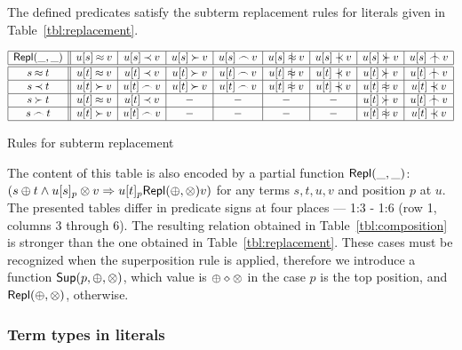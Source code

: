 \begin{lemma} \label{le:replacement-in-atoms}
The defined predicates satisfy the subterm replacement rules for literals
given in Table~\ref {tbl:replacement}.
\begin{table}[hbt]
\[\begin{array}{|c||c|c|c|c|c|c|c|c|}
\hline
 \Repl\_\_   & u[s]\Eq v   & u[s]\Incl v & u[s]\Cont v & u[s]\Int v & u[s]\notEq v & u[s]\notIncl v & u[s]\notCont v & u[s]\notInt v\\
\hline
\hline
s\Eq t   & u[t]\Eq v   & u[t]\Incl v & u[t]\Cont v & u[t]\Int v & u[t]\notEq v & u[t]\notIncl v & u[t]\notCont v & u[t]\notInt v\\
\hline
s\Incl t & u[t]\Cont v & u[t]\Int v  & u[t]\Cont v & u[t]\Int v & u[t]\notEq v & u[t]\notIncl v & u[t]\notEq v   & u[t]\notIncl v \\
\hline
s\Cont t & u[t]\Eq v   & u[t]\Incl v & -           & -          & -            & -              & u[t]\notCont v & u[t]\notInt v \\
\hline
s\Int t  & u[t]\Cont v & u[t]\Int v  & -           & -          & -            & -              & u[t]\notEq v   & u[t]\notIncl v \\
\hline 
\end{array}\]
\caption{Rules for subterm replacement} \label{tbl:replacement}
\end{table}
\end{lemma}

The content of this table is also encoded by a partial function \(\mbox {\sf Repl}(\_,\_)\): \((s\oplus t\land u[s]_p\otimes v\mathrel\Rightarrow u[t]_p \mbox {\sf Repl}(\oplus,\otimes)
v)\) for any terms $s,t,u,v$ and position $p$ at $u$.  The presented tables
differ in predicate signs at four places --- 1:3 - 1:6 (row 1, columns 3
through 6). The resulting relation obtained in Table~\ref {tbl:composition}
is stronger than the one obtained in Table~\ref {tbl:replacement}.  These
cases must be recognized when the superposition rule is applied, therefore we
introduce a function \(\mbox {\sf Sup}(p ,\oplus ,\otimes)\), which value is \(\oplus\diamond\otimes\) in the case $p$ is the top position, and \(\mbox {\sf Repl}(\oplus,\otimes)\), otherwise.

\subsubsection{Term types in literals}

